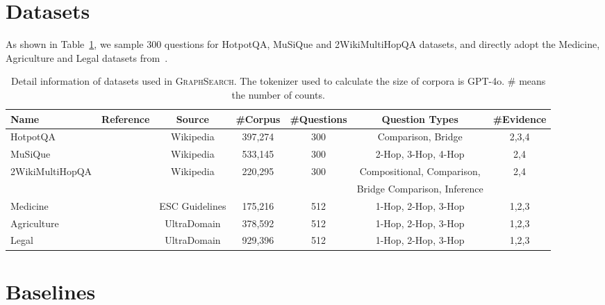 \section{Datasets}
\label{app:datasets}
As shown in Table~\ref{Tab:dataset}, we sample 300 questions for HotpotQA, MuSiQue and 2WikiMultiHopQA datasets, and directly adopt the Medicine, Agriculture and Legal datasets from~\citep{hypergraphrag}.

\begin{table}[ht]
\centering
\label{Tab:dataset}
\caption{Detail information of datasets used in \textsc{GraphSearch}. The tokenizer used to calculate the size of corpora is GPT-4o. \# means the number of counts.}
\scriptsize
\setlength{\tabcolsep}{4pt}
\begin{tabular}{lcccccc}
\toprule
\textbf{Name} & \textbf{Reference} & \textbf{Source} & \textbf{\#Corpus} & \textbf{\#Questions} & \textbf{Question Types} & \textbf{\#Evidence} \\
\midrule
HotpotQA          & ~\citep{hotpotqa} & Wikipedia & 397,274  & 300  & Comparison, Bridge  & 2,3,4     \\
MuSiQue           & ~\citep{musique} & Wikipedia & 533,145  & 300  & 2-Hop, 3-Hop, 4-Hop  & 2,4     \\
2WikiMultiHopQA   & ~\citep{2wiki}  & Wikipedia & 220,295  & 300  & Compositional, Comparison,   &  2,4    \\
 & & & & & Bridge Comparison, Inference & \\
Medicine          & ~\citep{medicine} & ESC Guidelines & 175,216  &  512 & 1-Hop, 2-Hop, 3-Hop  &   1,2,3   \\
Agriculture       & ~\citep{ultradomain} & UltraDomain & 378,592  &  512 & 1-Hop, 2-Hop, 3-Hop  &   1,2,3   \\
Legal             & ~\citep{ultradomain} & UltraDomain & 929,396  &  512 & 1-Hop, 2-Hop, 3-Hop  &   1,2,3   \\
\bottomrule
\end{tabular}
\end{table}

\section{Baselines}
\label{app:baselines}

